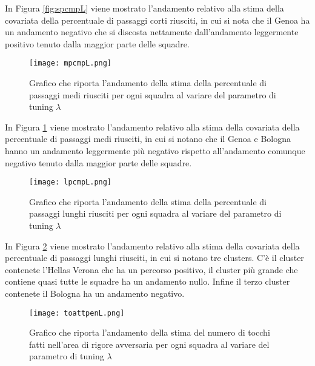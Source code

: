 In Figura \ref{fig:spcmpL} viene mostrato l'andamento relativo alla stima della covariata della percentuale di passaggi corti riusciti, in cui si nota che il Genoa ha un andamento negativo che si discosta nettamente dall'andamento leggermente positivo tenuto dalla maggior parte delle squadre.

\begin{figure}[htbp]
	\begin{center}
		\texttt{[image: mpcmpL.png]}
		\caption{Grafico che riporta l'andamento della stima della percentuale di passaggi medi riusciti per ogni squadra al variare del parametro di tuning $\lambda$} \label{fig:mpcmpL}
	\end{center}
\end{figure}

In Figura \ref{fig:mpcmpL} viene mostrato l'andamento relativo alla stima della covariata della percentuale di passaggi medi riusciti, in cui si notano che il Genoa e Bologna hanno un andamento leggermente più negativo rispetto all'andamento comunque negativo tenuto dalla maggior parte delle squadre.

\begin{figure}[htbp]
	\begin{center}
		\texttt{[image: lpcmpL.png]}
		\caption{Grafico che riporta l'andamento della stima della percentuale di passaggi lunghi riusciti per ogni squadra al variare del parametro di tuning $\lambda$} \label{fig:lpcmpL}
	\end{center}
\end{figure}

In Figura \ref{fig:lpcmpL} viene mostrato l'andamento relativo alla stima della covariata della percentuale di passaggi lunghi riusciti, in cui si notano tre clusters. C'è il cluster contenete l'Hellas Verona che ha un percorso positivo, il cluster più grande che contiene quasi tutte le squadre ha un andamento nullo. Infine il terzo cluster contenete il Bologna ha un andamento negativo.

\begin{figure}[htbp]
	\begin{center}
		\texttt{[image: toattpenL.png]}
		\caption{Grafico che riporta l'andamento della stima del numero di tocchi fatti nell'area di rigore avversaria per ogni squadra al variare del parametro di tuning $\lambda$} \label{fig:toattpenL}
	\end{center}
\end{figure}

